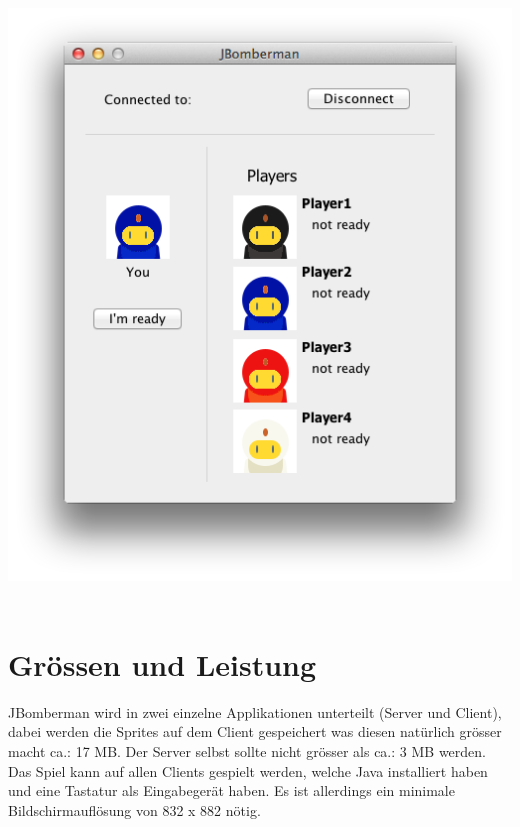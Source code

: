 \documentclass[11pt]{scrartcl}
\begin{document}
\includegraphics[scale=0.5]{Lobby}
 
\newpage


\section{Grössen und Leistung}
JBomberman wird in zwei einzelne Applikationen unterteilt (Server und Client), dabei werden die Sprites auf dem Client gespeichert was diesen natürlich grösser macht ca.: 17 MB. Der Server selbst sollte nicht grösser als ca.: 3 MB werden.
Das Spiel kann auf allen Clients gespielt werden, welche Java installiert haben und eine Tastatur als Eingabegerät haben.
Es ist allerdings ein minimale Bildschirmauflösung von 832 x 882 nötig.
\end{document}
